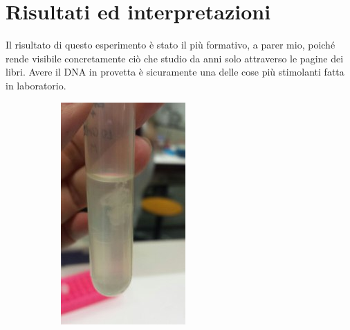 \documentclass[twocolumn,a4paper,10pt]{my_report}
\begin{document}
\section{Risultati ed interpretazioni}
Il risultato di questo esperimento è stato il più formativo, a parer mio, poiché rende visibile concretamente ciò che studio da anni solo attraverso le pagine dei libri.
Avere il DNA in provetta è sicuramente una delle cose più stimolanti fatta in laboratorio.

\begin{figure}[htbp]
\begin{subfigure}{0.5\linewidth}
\centering
\includegraphics[width=0.8\linewidth]{3.jpg}
\label{fig:DNAunipv_a}
\end{subfigure}%
\begin{subfigure}{0.5\linewidth}
\centering

\end{subfigure}
\end{figure}
\end{document}
